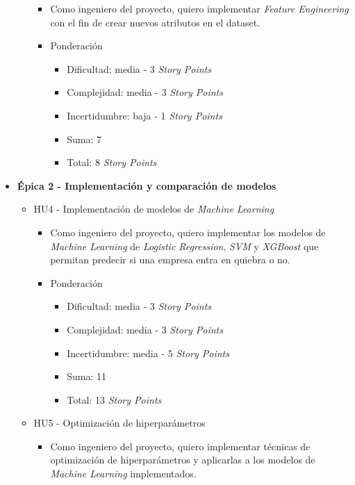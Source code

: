 \documentclass[
11pt, %
]{charter}
\begin{document}
\begin{itemize}
\begin{itemize}
        \begin{itemize}
            \item Como ingeniero del proyecto, quiero implementar \textit{Feature Engineering} con el fin de crear nuevos atributos en el dataset.
            \item Ponderación
            \begin{itemize}
                \item Dificultad: media - 3 \textit{Story Points}
                \item Complejidad: media - 3 \textit{Story Points}
                \item Incertidumbre: baja - 1 \textit{Story Points}
                \item Suma: 7 
                \item Total: 8 \textit{Story Points}
            \end{itemize}
        \end{itemize}
    \end{itemize}
  \item \textbf{\'{E}pica 2 - Implementación y comparación de modelos}
    \begin{itemize}
      \item HU4 - Implementación de modelos de \textit{Machine Learning}
        \begin{itemize}
            \item Como ingeniero del proyecto, quiero implementar los modelos de \textit{Machine Learning} de \textit{Logistic Regression}, \textit{SVM} y \textit{XGBoost} que permitan predecir si una empresa entra en quiebra o no.
            \item Ponderación
            \begin{itemize}
                \item Dificultad: media - 3 \textit{Story Points}
                \item Complejidad: media - 3 \textit{Story Points}
                \item Incertidumbre: media - 5 \textit{Story Points}
                \item Suma: 11
                \item Total: 13 \textit{Story Points}
            \end{itemize}
        \end{itemize}
      \item HU5 - Optimización de hiperparámetros
        \begin{itemize}
            \item Como ingeniero del proyecto, quiero implementar técnicas de optimización de hiperparámetros y aplicarlas a los modelos de \textit{Machine Learning} implementados.

\end{itemize}
\end{itemize}
\end{itemize}
\end{document}
